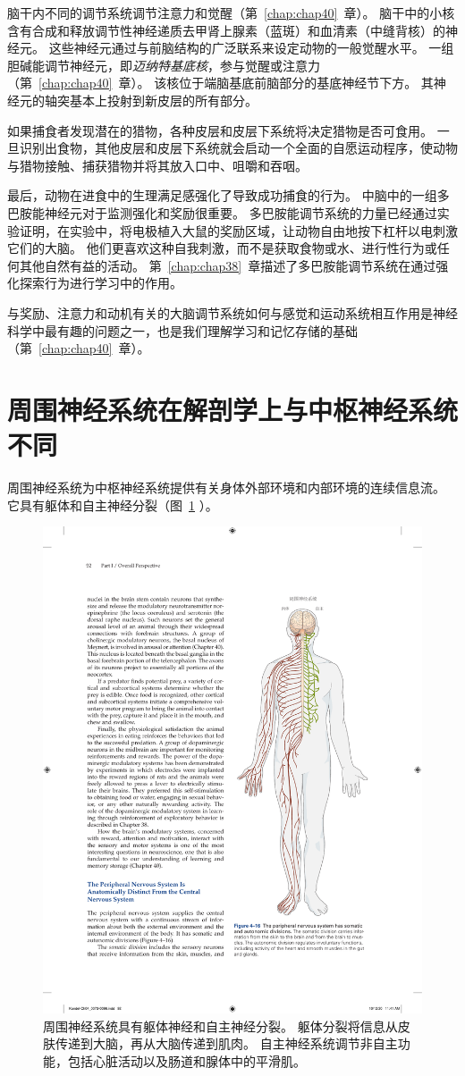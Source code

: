 脑干内不同的调节系统调节注意力和觉醒（第~\ref{chap:chap40}~章）。 
脑干中的小核含有合成和释放调节性神经递质去甲肾上腺素（蓝斑）和血清素（中缝背核）的神经元。 
这些神经元通过与前脑结构的广泛联系来设定动物的一般觉醒水平。 
一组胆碱能调节神经元，即\textit{迈纳特基底核}，参与觉醒或注意力（第~\ref{chap:chap40}~章）。
该核位于端脑基底前脑部分的基底神经节下方。 
其神经元的轴突基本上投射到新皮层的所有部分。


如果捕食者发现潜在的猎物，各种皮层和皮层下系统将决定猎物是否可食用。 
一旦识别出食物，其他皮层和皮层下系统就会启动一个全面的自愿运动程序，使动物与猎物接触、捕获猎物并将其放入口中、咀嚼和吞咽。


最后，动物在进食中的生理满足感强化了导致成功捕食的行为。 
中脑中的一组多巴胺能神经元对于监测强化和奖励很重要。 
多巴胺能调节系统的力量已经通过实验证明，在实验中，将电极植入大鼠的奖励区域，让动物自由地按下杠杆以电刺激它们的大脑。 
他们更喜欢这种自我刺激，而不是获取食物或水、进行性行为或任何其他自然有益的活动。 
第~\ref{chap:chap38}~章描述了多巴胺能调节系统在通过强化探索行为进行学习中的作用。


与奖励、注意力和动机有关的大脑调节系统如何与感觉和运动系统相互作用是神经科学中最有趣的问题之一，也是我们理解学习和记忆存储的基础（第~\ref{chap:chap40}~章）。



\section{周围神经系统在解剖学上与中枢神经系统不同}

周围神经系统为中枢神经系统提供有关身体外部环境和内部环境的连续信息流。 
它具有躯体和自主神经分裂（图~\ref{fig:4_16} ）。


\begin{figure}[htbp]
	\centering
	\includegraphics[width=0.55\linewidth]{chap04/fig_4_16}
	\caption{周围神经系统具有躯体神经和自主神经分裂。
		躯体分裂将信息从皮肤传递到大脑，再从大脑传递到肌肉。
		自主神经系统调节非自主功能，包括心脏活动以及肠道和腺体中的平滑肌。}
	\label{fig:4_16}
\end{figure}


